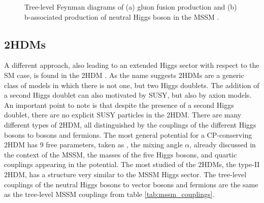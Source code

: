 \begin{figure}[h!]
\begin{center}
\end{center}
\caption{Tree-level Feynman diagrams of (a) gluon fusion production and (b) b-associated
production of neutral Higgs boson in the MSSM \cite{CMS-PAS-HIG-16-037}.}
\label{fig:production_mssm}
\end{figure}

\subsection{\acl{2HDM}s}
\label{sec:theory_2HDM}
A different approach, also leading to an extended Higgs sector with
respect to the \ac{SM} case, is found in the \ac{2HDM} \cite{2HDM-I,2HDM-II}.
As the name suggests \ac{2HDM}s are a generic class of models in which
there is not one, but two Higgs doublets. The addition of a second
Higgs doublet can also motivated by \ac{SUSY}, but also by axion models.
An important point to note is that despite the presence of a second 
Higgs doublet, there are no explicit \ac{SUSY} particles in the \ac{2HDM}.
There are many different types of \ac{2HDM}, all distinguished by the couplings
of the different Higgs bosons to bosons and fermions. The 
most general potential for a CP-conserving 2HDM has 9 free parameters,
taken as \tanb, the mixing angle $\alpha$, already discussed in 
the context of the \ac{MSSM}, the masses of the five Higgs bosons,
and quartic couplings appearing in the potential. The most studied of the
\ac{2HDM}s, the type-II \ac{2HDM}, has a structure very similar to 
the MSSM Higgs sector. The tree-level couplings of the neutral Higgs bosons to 
vector bosons and fermions are the same as the tree-level \ac{MSSM} couplings 
from table \ref{tab:mssm_couplings}. %

